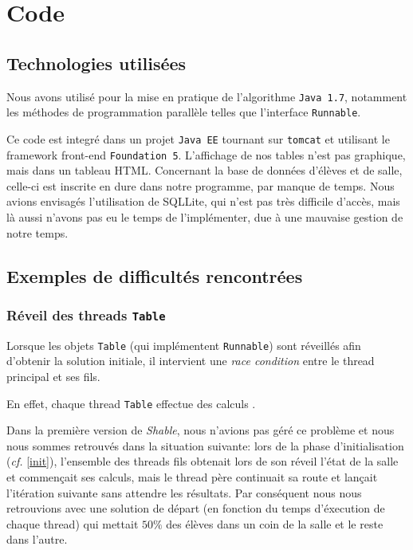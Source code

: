 \documentclass[11pt,a4paper, openany]{book}
\begin{document}
\chapter{Code}

\section{Technologies utilisées}

Nous avons utilisé pour la mise en pratique de l'algorithme \texttt{Java 1.7}, notamment les méthodes de programmation parallèle telles que l'interface \texttt{Runnable}.

Ce code est integré dans un projet \texttt{Java EE} tournant sur \texttt{tomcat} et utilisant le framework front-end \texttt{Foundation 5}.
L'affichage de nos tables n'est pas graphique, mais dans un tableau HTML.
Concernant la base de données d'élèves et de salle, celle-ci est inscrite en dure dans notre programme, par manque de temps. Nous avions envisagés l'utilisation de SQLLite, qui n'est pas très difficile d'accès, mais là aussi n'avons pas eu le temps de l'implémenter, due à une mauvaise gestion de notre temps.

\section{Exemples de difficultés rencontrées}

\subsection{Réveil des threads \texttt{Table}}

Lorsque les objets \texttt{Table} (qui implémentent \texttt{Runnable}) sont réveillés afin d'obtenir la solution initiale, il intervient une \textit{race condition} entre le thread principal et ses fils.

En effet, chaque thread \texttt{Table} effectue des calculs .

Dans la première version de \textit{Shable}, nous n'avions pas géré ce problème et nous nous sommes retrouvés dans la situation suivante: lors de la phase d'initialisation (\textit{cf.} \ref{init}), l'ensemble des threads fils obtenait lors de son réveil l'état de la salle et commençait ses calculs, mais le thread père continuait sa route et lançait l'itération suivante sans attendre les résultats. Par conséquent nous nous retrouvions avec une solution de départ (en fonction du temps d'éxecution de chaque thread) qui mettait $50\%$ des élèves dans un coin de la salle et le reste dans l'autre.
\end{document}
